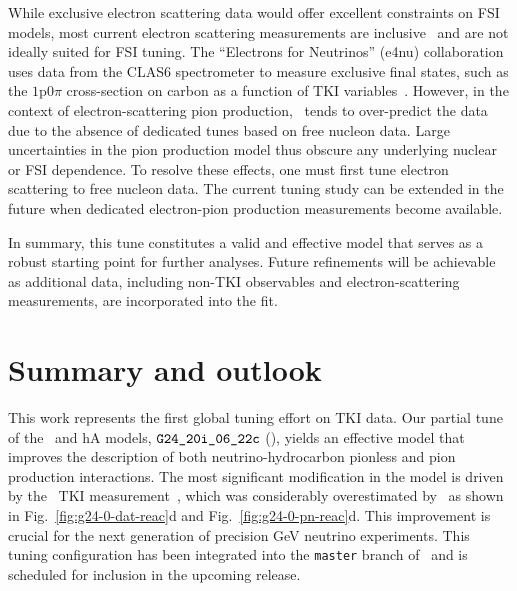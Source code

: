 While exclusive electron scattering data would offer excellent constraints on FSI models, most current electron scattering measurements are inclusive~\cite{electronsforneutrinos:2020tbf} and are not ideally suited for FSI tuning.
The ``Electrons for Neutrinos'' (e4nu) collaboration uses data from the CLAS6 spectrometer to measure exclusive final states, such as the $1\textrm{p}0\pi$ cross-section on carbon as a function of TKI variables~\cite{CLAS:2021neh}.
However, in the context of electron-scattering pion production, \genie\ tends to over-predict the data due to the absence of dedicated tunes based on free nucleon data. 
Large uncertainties in the pion production model thus obscure any underlying nuclear or FSI dependence. 
To resolve these effects, one must first tune electron scattering to free nucleon data. 
The current tuning study can be extended in the future when dedicated electron-pion production measurements become available.

In summary, this tune constitutes a valid and effective model that serves as a robust starting point for further analyses. 
Future refinements will be achievable as additional data, including non-TKI observables and electron-scattering measurements, are incorporated into the fit.

\section{\label{sec:summary}Summary and outlook}
This work represents the first global tuning effort on TKI data. 
Our partial tune of the \sfcfg\ and hA models, $\texttt{G24\_20i\_06\_22c}$ (\gC), yields an effective model that improves the description of both neutrino-hydrocarbon pionless and pion production interactions. 
The most significant modification in the model is driven by the \minpiz\ TKI measurement~\cite{MINERvA:2020anu}, which was considerably overestimated by \genie\ as shown in Fig.~\ref{fig:g24-0-dat-reac}d and Fig.~\ref{fig:g24-0-pn-reac}d. 
This improvement is crucial for the next generation of precision GeV neutrino experiments. 
This tuning configuration has been integrated into the \texttt{master} branch of \genie\ and is scheduled for inclusion in the upcoming release.

